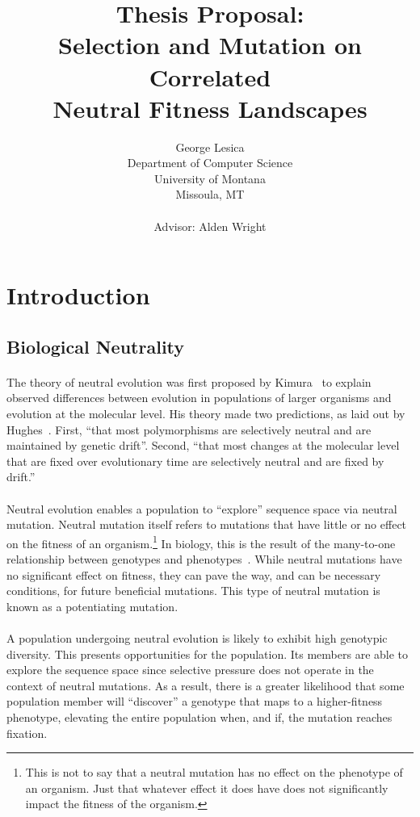 \documentclass[12pt,letterpaper,titlepage]{article}
\title{Thesis Proposal:\\
Selection and Mutation on Correlated\\
Neutral Fitness Landscapes}
\author{George Lesica\\
Department of Computer Science\\
University of Montana\\
Missoula, MT\\
\\
Advisor: Alden Wright}
\begin{document}
\maketitle

\section{Introduction}

\subsection{Biological Neutrality}

\paragraph{}
The theory of neutral evolution was first proposed by Kimura~\cite{Kimura1984}
to explain observed differences between evolution in populations of larger
organisms and evolution at the molecular level. His theory made two
predictions, as laid out by Hughes~\cite{Hughes2007}. First, ``that most
polymorphisms are selectively neutral and are maintained by genetic drift''.
Second, ``that most changes at the molecular level that are fixed over
evolutionary time are selectively neutral and are fixed by drift.''

\paragraph{}
Neutral evolution enables a population to ``explore'' sequence space via
neutral mutation. Neutral mutation itself refers to mutations that have little
or no effect on the fitness of an organism.\footnote{This is not to say that a
neutral mutation has no effect on the phenotype of an organism. Just that
whatever effect it does have does not significantly impact the fitness of the
organism.} In biology, this is the result of the many-to-one relationship
between genotypes and phenotypes~\cite{Newman1998}. While neutral mutations
have no significant effect on fitness, they can pave the way, and can be
necessary conditions, for future beneficial mutations. This type of neutral
mutation is known as a potentiating mutation.

\paragraph{}
A population undergoing neutral evolution is likely to exhibit high genotypic
diversity. This presents opportunities for the population. Its members are able
to explore the sequence space since selective pressure does not operate in the
context of neutral mutations. As a result, there is a greater likelihood that
some population member will ``discover'' a genotype that maps to a
higher-fitness phenotype, elevating the entire population when, and if, the
mutation reaches fixation.
\end{document}
